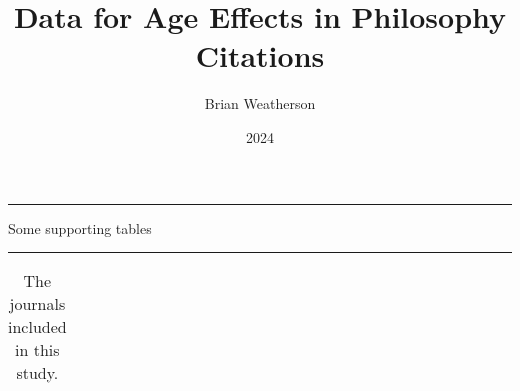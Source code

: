 \documentclass[
  10pt,
  letterpaper,
  DIV=11,
  numbers=noendperiod,
  twoside]{scrartcl}
\title{Data for Age Effects in Philosophy Citations}
\author{Brian Weatherson}
\date{2024}
\renewenvironment{abstract}
 {\vspace{-1.25cm}
 \quotation\small\noindent\rule{\linewidth}{.5pt}\par\smallskip
 \noindent }
 {\par\noindent\rule{\linewidth}{.5pt}\endquotation}
\begin{document}
\maketitle
\begin{abstract}
Some supporting tables
\end{abstract}


\begin{longtable}[]{@{}
  >{\raggedright\arraybackslash}p{}
  >{\raggedleft\arraybackslash}p{}
  >{\raggedleft\arraybackslash}p{}
  >{\raggedleft\arraybackslash}p{}@{}}

\caption{\label{tbl-list-of-journals}The journals included in this
study.}

\tabularnewline


\end{longtable}
\end{document}
